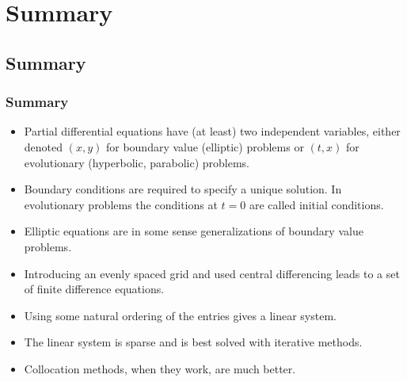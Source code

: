 \documentclass{beamer}
\begin{document}
\section{Summary}

\subsection{Summary}

\begin{frame}
  \frametitle{Summary}

  \begin{itemize}
  \item Partial differential equations have (at least) two independent
    variables, either denoted $(x,y)$ for boundary value (elliptic)
    problems or $(t,x)$ for evolutionary (hyperbolic, parabolic)
    problems.
  \item Boundary conditions are required to specify a unique
    solution. In evolutionary problems the conditions at $t=0$ are
    called initial conditions.
  \item Elliptic equations are in some sense generalizations of
    boundary value problems.
  \item Introducing an evenly spaced grid and used central
    differencing leads to a set of finite difference equations.
  \item Using some natural ordering of the entries gives a linear
    system.
  \item The linear system is sparse and is best solved with iterative
    methods.
  \item Collocation methods, when they work, are much better.
  \end{itemize}

\end{frame}
\end{document}
